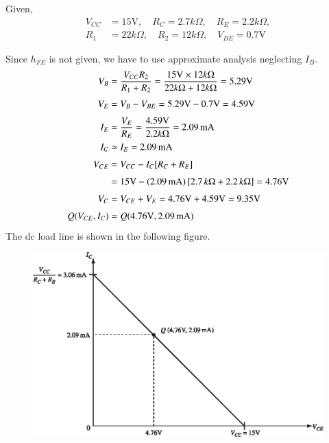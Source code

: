 \begin{solution}
Given,
\begin{align*}
 V_{CC} &= 15\text{V},\quad R_{C}=2.7 k\Omega,\quad R_{E}=2.2 k\Omega,\\[3pt]
 R_{1} &= 22 k\Omega,\quad R_{2}=12 k\Omega,\quad V_{BE}=0.7 \text{V}
\end{align*}

Since $h_{FE}$ is not given, we have to use approximate analysis neglecting $I_{B}$.
\begin{align*}
V_{B} &= \frac{V_{CC}R_{2}}{R_{1}+R_{2}}=\frac{15\text{V}\times 12 k\Omega}{22 k\Omega+12 k\Omega}=5.29\text{V}\\[3pt]
V_{E} &= V_{B}-V_{BE}=5.29\text{V}-0.7\text{V}=4.59\text{V}\\[3pt]
I_{E} &= \frac{V_{E}}{R_{E}}=\frac{4.59\text{V}}{2.2 k\Omega}=2.09\text{\,mA}\\
I_{C} &\simeq I_{E}=2.09\text{\,mA}\\[3pt]
V_{CE} &= V_{CC}-I_{C}[R_{C}+R_{E}]\\[3pt]
&= 15\text{V}-(2.09\text{\,mA})\,[2.7\,k\Omega+2.2\,k\Omega]=4.76\text{V}\\[3pt]
V_{C} &= V_{CE}+V_{E}=4.76\text{V}+4.59\text{V}= 9.35\text{V}\\[3pt]
Q(V_{CE},I_{C}) &= Q(4.76\text{V}, 2.09\text{\,mA})
\end{align*}
The dc load line is shown in the following figure.
\begin{figure}[H]
\centering
\includegraphics[scale=.93]{chap3/S3-EE-03-IN026.eps}
\end{figure}
\vskip -1cm
\end{solution}

\eject

